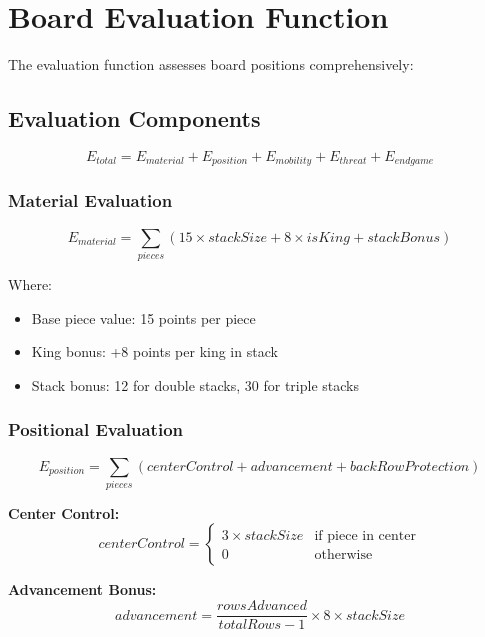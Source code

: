 \documentclass[12pt,a4paper]{article}
\begin{document}
\section{Board Evaluation Function}

The evaluation function assesses board positions comprehensively:

\subsection{Evaluation Components}

\begin{equation}
E_{total} = E_{material} + E_{position} + E_{mobility} + E_{threat} + E_{endgame}
\end{equation}

\subsubsection{Material Evaluation}
\begin{equation}
E_{material} = \sum_{pieces} (15 \times stackSize + 8 \times isKing + stackBonus)
\end{equation}

Where:
\begin{itemize}
    \item Base piece value: 15 points per piece
    \item King bonus: +8 points per king in stack
    \item Stack bonus: 12 for double stacks, 30 for triple stacks
\end{itemize}

\subsubsection{Positional Evaluation}
\begin{equation}
E_{position} = \sum_{pieces} (centerControl + advancement + backRowProtection)
\end{equation}

\textbf{Center Control:}
\begin{equation}
centerControl = \begin{cases}
3 \times stackSize & \text{if piece in center} \\
0 & \text{otherwise}
\end{cases}
\end{equation}

\textbf{Advancement Bonus:}
\begin{equation}
advancement = \frac{rowsAdvanced}{totalRows - 1} \times 8 \times stackSize
\end{equation}
\end{document}
